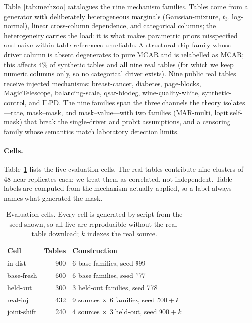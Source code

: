 \documentclass[conference]{IEEEtran}
\begin{document}
Table~\ref{tab:mechzoo} catalogues the nine mechanism families. Tables come from a generator
with deliberately heterogeneous marginals (Gaussian-mixture, $t_3$, log-normal), linear
cross-column dependence, and categorical columns; the heterogeneity carries the load: it is
what makes parametric priors misspecified and naive within-table references unreliable. A
structural-skip family whose driver column is absent degenerates to pure MCAR and is
relabelled as MCAR; this affects $4\%$ of synthetic tables and all nine real tables (for which we keep
numeric columns only, so no categorical driver exists). Nine public real tables receive injected
mechanisms: breast-cancer, diabetes, page-blocks, MagicTelescope,
balancing-scale, qsar-biodeg, wine-quality-white, synthetic-control, and ILPD. The nine
families span the three channels the theory isolates---rate, mask--mask, and
mask--value---with two families (MAR-multi, logit self-mask) that break the single-driver and
probit assumptions, and a censoring family whose semantics match laboratory detection limits.

\paragraph{Cells.} Table~\ref{tab:cells} lists the five evaluation cells. The real tables
contribute nine clusters of 48 near-replicates each; we treat them as correlated, not
independent. Table labels are computed from the mechanism actually applied, so a label always
names what generated the mask.

\begin{table}[t]
\caption{Evaluation cells. Every cell is generated by script from the seed shown, so all five
are reproducible without the real-table download; $k$ indexes the real source.}
\label{tab:cells}
\centering\small
\begin{tabular}{lrl}
\toprule
Cell & Tables & Construction \\
\midrule
in-dist & 900 & 6 base families, seed 999 \\
base-fresh & 600 & 6 base families, seed 777 \\
held-out & 300 & 3 held-out families, seed 778 \\
real-inj & 432 & 9 sources $\times$ 6 families, seed $500{+}k$ \\
joint-shift & 240 & 4 sources $\times$ 3 held-out, seed $900{+}k$ \\
\bottomrule
\end{tabular}
\end{table}
\end{document}
